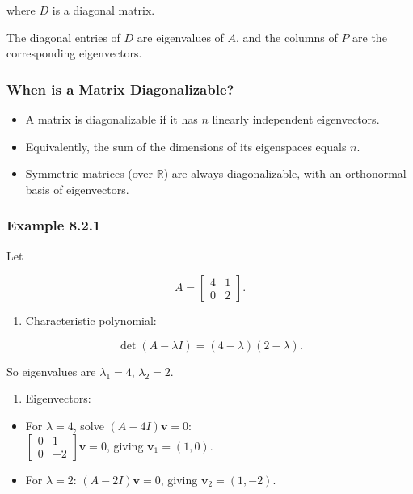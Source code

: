\documentclass[
  12pt,
  a4paper,
]{article}
\begin{document}
where \(D\) is a diagonal matrix.

The diagonal entries of \(D\) are eigenvalues of \(A\), and the columns
of \(P\) are the corresponding eigenvectors.

\subsubsection{When is a Matrix
Diagonalizable?}\label{when-is-a-matrix-diagonalizable}

\begin{itemize}
\item
  A matrix is diagonalizable if it has \(n\) linearly independent
  eigenvectors.
\item
  Equivalently, the sum of the dimensions of its eigenspaces equals
  \(n\).
\item
  Symmetric matrices (over \(\mathbb{R}\)) are always diagonalizable,
  with an orthonormal basis of eigenvectors.
\end{itemize}

\subsubsection{Example 8.2.1}\label{example-821}

Let

\[A = \begin{bmatrix} 4 & 1 \\ 0 & 2 \end{bmatrix}.\]

\begin{enumerate}
\def\labelenumi{\arabic{enumi}.}
\item
  Characteristic polynomial:
\end{enumerate}

\[\det(A - \lambda I) = (4-\lambda)(2-\lambda).\]

So eigenvalues are \(\lambda_1 = 4\), \(\lambda_2 = 2\).

\begin{enumerate}
\def\labelenumi{\arabic{enumi}.}
\item
  Eigenvectors:
\end{enumerate}

\begin{itemize}
\item
  For \(\lambda = 4\), solve \((A-4I)\mathbf{v}=0\):\\
  \(\begin{bmatrix} 0 & 1 \\ 0 & -2 \end{bmatrix}\mathbf{v} = 0\),
  giving \(\mathbf{v}_1 = (1,0)\).
\item
  For \(\lambda = 2\): \((A-2I)\mathbf{v}=0\), giving
  \(\mathbf{v}_2 = (1,-2)\).
\end{itemize}
\end{document}
